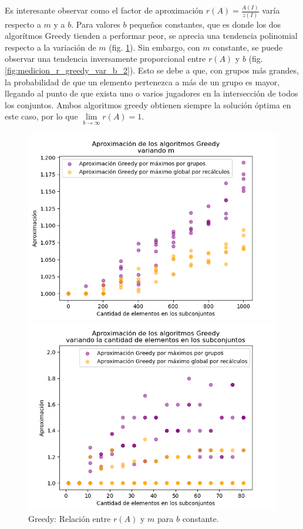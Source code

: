 Es interesante observar como el factor de aproximación $r(A)=\frac{A(I)}{z(I)}$ varía respecto a $m$ y a $b$. Para valores $b$ pequeños constantes, que es donde los dos algorítmos Greedy tienden a performar peor, se aprecia una tendencia polinomial respecto a la variación de $m$ (fig. \ref{fig:medicion_r_greedy_var_m}). Sin embargo, con $m$ constante, se puede observar una tendencia inversamente proporcional entre $r(A)$ y $b$ (fig. \ref{fig:medicion_r_greedy_var_b_2}). Esto se debe a que, con grupos más grandes, la probabilidad de que un elemento pertenezca a más de un grupo es mayor, llegando al punto de que exista uno o varios jugadores en la intersección de todos los conjuntos. Ambos algoritmos greedy obtienen siempre la solución óptima en este caso, por lo que $\lim\limits_{b \rightarrow \infty}r(A)=1$.

\begin{figure}[h]
    \centering
    \begin{minipage}{0.45\textwidth}
        \centering
        \includegraphics[width=\textwidth]{img/medicion_r_greedy_var_m.png}
        \caption{Greedy: Relación entre $r(A)$ y $m$ para $b$ constante.}
        \label{fig:medicion_r_greedy_var_m}
    \end{minipage}\hfill
    \begin{minipage}{0.45\textwidth}
        \centering
        \includegraphics[width=\textwidth]{img/medicion_r_greedy_var_b_1.png}

\end{minipage}
\end{figure}
